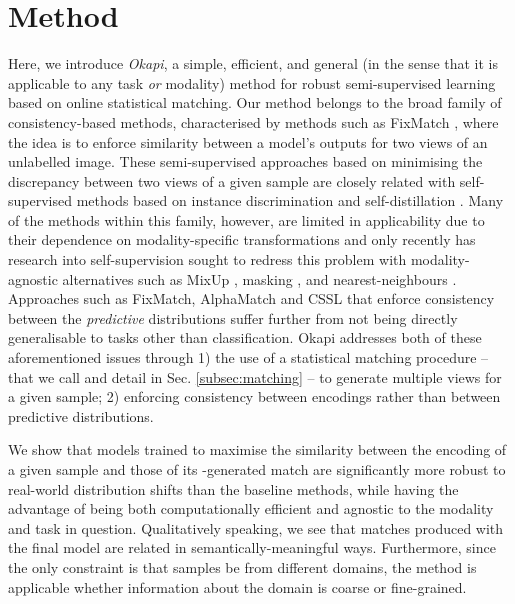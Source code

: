\section{Method}\label{sec:method}
Here, we introduce \emph{Okapi}, a simple, efficient, and general (in the sense that it is
applicable to any task \emph{or} modality) method for robust semi-supervised learning based on
online statistical matching. 
%
Our method belongs to the broad family of consistency-based methods, characterised by methods such
as FixMatch \citep{sohn2020fixmatch}, where the idea is to enforce similarity between a model's
outputs for two views of an unlabelled image. 
%
These semi-supervised approaches based on minimising the discrepancy between two views of a given
sample are closely related with self-supervised methods based on instance discrimination
\citep{chen2020simple} and self-distillation
\citep{baevski2022data2vec,caron2021emerging,grill2020bootstrap}.
%
Many of the methods within this family, however, are limited in applicability due to their
dependence on modality-specific transformations and only recently has research into
self-supervision sought to redress this problem with modality-agnostic alternatives such as MixUp
\citep{verma2021towards}, masking \citep{baevski2022data2vec}, and nearest-neighbours
\citep{dwibedi2021little, koohpayegani2021mean, van2021revisiting}.
%
Approaches such as FixMatch, AlphaMatch \citep{gong2021alphamatch} and CSSL
\citep{lienen2021credal} that enforce consistency between the \emph{predictive} distributions
suffer further from not being directly generalisable to tasks other than classification.
%
Okapi addresses both of these aforementioned issues through 1) the use of a statistical matching
procedure -- that we call \CNN{} and detail in Sec. \ref{subsec:matching} -- to generate multiple
views for a given sample; 2) enforcing consistency between encodings rather than between predictive
distributions.

We show that models trained to maximise the similarity between the encoding of a given sample and
those of its \CNN{}-generated match are significantly more robust to real-world distribution shifts
than the baseline methods, while  having the advantage of being both computationally efficient and
agnostic to the modality and task in question.
%
Qualitatively speaking, we see that matches produced with the final model are related in
semantically-meaningful ways. 
%
Furthermore, since the only constraint is that samples be from different domains, the method is
applicable whether information about the domain is coarse or fine-grained.
%

